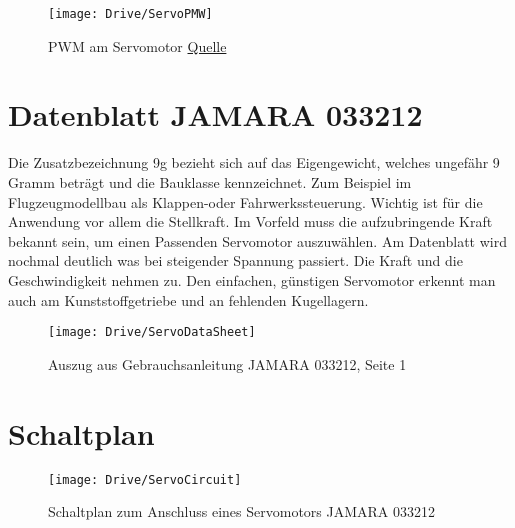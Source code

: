 \begin{description}
  \begin{figure}
    \begin{center}
        \texttt{[image: Drive/ServoPMW]}
        \caption{PWM am Servomotor \href{https://howtomechatronics.com/wp-content/uploads/2018/03/RC-Servo-Motor-Control-Signal-768x485.png?ezimgfmt=ng:webp/ngcb2}{Quelle}}
    \end{center}
  \end{figure}

\end{description}


\section{Datenblatt JAMARA 033212} 

Die Zusatzbezeichnung 9g bezieht sich auf das Eigengewicht, welches ungefähr 9 Gramm beträgt und die Bauklasse kennzeichnet. Zum Beispiel im Flugzeugmodellbau als Klappen-oder Fahrwerkssteuerung. Wichtig ist für die Anwendung vor allem die Stellkraft. Im Vorfeld muss die aufzubringende Kraft bekannt sein, um einen Passenden Servomotor auszuwählen. Am Datenblatt wird nochmal deutlich was bei steigender Spannung passiert. Die Kraft und die Geschwindigkeit nehmen zu. Den einfachen, günstigen Servomotor erkennt man auch am Kunststoffgetriebe und an fehlenden Kugellagern.

\begin{figure}
  \begin{center}
    \texttt{[image: Drive/ServoDataSheet]}
    \caption{Auszug aus Gebrauchsanleitung JAMARA 033212, Seite 1 \cite{Jamara:2018}}
  \end{center}
\end{figure}



\section{Schaltplan}

\begin{figure}
    \begin{center} 
        \texttt{[image: Drive/ServoCircuit]}
        \caption{Schaltplan zum Anschluss eines Servomotors JAMARA 033212}
    \end{center} 
\end{figure}
